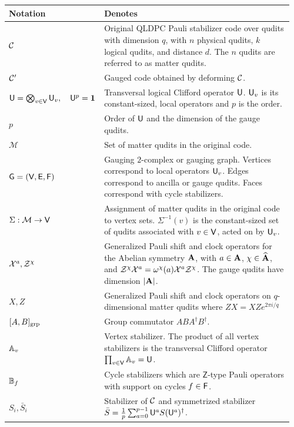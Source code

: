 \documentclass[aps,prx,onecolumn,nofootinbib,11pt,superscriptaddress]{revtex4-2}
\begin{document}
\begin{longtable}{p{0.25\linewidth}p{0.71\linewidth}}
    \toprule
    Notation & Denotes \\
        \midrule
    \endhead
        $\mathcal{C} $ & Original QLDPC Pauli stabilizer code over qudits with dimension $q$, with $n$ physical qudits, $k$ logical qudits, and distance $d$. The $n$ qudits are referred to as matter qudits.\\
        $\mathcal{C}'$ & Gauged code obtained by deforming $\mathcal{C}$.
        \\
        $\mathsf{U} = \bigotimes_{v\in \mathsf{V}}\mathsf{U}_v, \quad \mathsf{U}^p = \mathbf{1}$ & Transversal logical Clifford operator $\mathsf{U}$. $\mathsf{U}_v$ is its constant-sized, local operators and $p$ is the order.
        \\
        $p$ & Order of $\mathsf{U}$ and the dimension of the gauge qudits.
        \\
        $\mathcal{M}$ & Set of matter qudits in the original code.
        \\
        $\mathsf{G} = (\mathsf{V}, \mathsf{E}, \mathsf{F})$ & Gauging $2$-complex or gauging graph. Vertices correspond to local operators $\mathsf{U}_v$. Edges correspond to ancilla or gauge qudits. Faces correspond with cycle stabilizers.
        \\
        $\Sigma : \mathcal{M} \to \mathsf{V}$ & Assignment of matter qudits in the original code to vertex sets. $\Sigma^{-1}(v)$ is the constant-sized set of qudits associated with $v\in \mathsf{V}$, acted on by $\mathsf{U}_v$.
        \\
        $\mathcal{X}^a, \mathcal{Z}^\chi$ & Generalized Pauli shift and clock operators for the Abelian symmetry $\mathbf{A}$, with $a\in\mathbf{A}$, $\chi\in\widehat{\mathbf{A}}$, and $\mathcal{Z}^\chi\mathcal{X}^a=\omega^\chi(a)\mathcal{X}^a\mathcal{Z}^\chi$. The gauge qudits have dimension $|\mathbf{A}|$.
        \\
        $X,Z$ & Generalized Pauli shift and clock operators on $q$-dimensional matter qudits where $ZX = XZ e^{2\pi i /q}$
        \\
        
        $[ A, B ]_{\text{grp}}$ & Group commutator $ABA^\dagger B^\dagger$. 
        \\
        
        $\mathbb{A}_v$ & Vertex stabilizer. The product of all vertex stabilizers is the transversal Clifford operator $\prod_{v\in \mathsf{V}}\mathbb{A}_v = \mathsf{U}$.
        \\
        $\mathbb{B}_f$ & Cycle stabilizers which are $\mathsf{Z}$-type Pauli operators with support on cycles $ f\in \mathsf{F}$.
        \\
        $S_i, \bar{S}_i$  & Stabilizer of $\mathcal{C}$ and symmetrized stabilizer $\bar{S} = \frac{1}{p}\sum_{a = 0}^{p-1} \mathsf{U}^a S (\mathsf{U}^a)^\dagger$.
        \\


\end{longtable}
\end{document}
